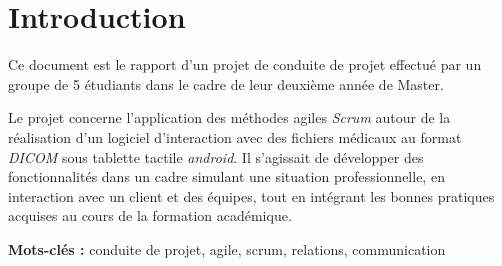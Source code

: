 \chapter{Introduction}

Ce document est le rapport d'un projet de conduite de projet effectué par un groupe de 5 étudiants dans le cadre de leur deuxième année de Master.

Le projet concerne l'application des méthodes agiles \emph{Scrum} autour de la réalisation d'un logiciel d'interaction avec des fichiers médicaux au format \emph{DICOM} sous tablette tactile \emph{android}. Il s'agissait de développer des fonctionnalités dans un cadre simulant une situation professionnelle, en interaction avec un client et des équipes, tout en intégrant les bonnes pratiques acquises au cours de la formation académique.

\vfill

\textbf{Mots-clés :} conduite de projet, agile, scrum, relations, communication

\vfill
